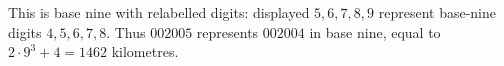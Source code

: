 This is base nine with relabelled digits: displayed $5,6,7,8,9$ represent base-nine digits $4,5,6,7,8$. Thus $002005$ represents $002004$ in base nine, equal to $2\cdot9^3+4=\boxed{1462}$ kilometres.
